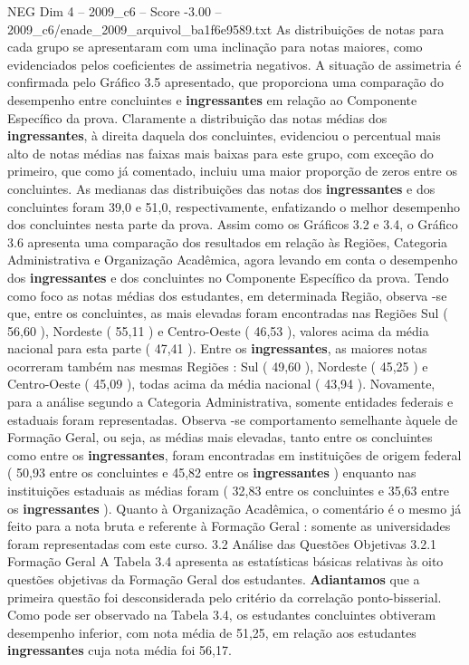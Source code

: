 \begin{textsample}{NEG Dim 4 – 2009\_c6 – Score -3.00 – 2009\_c6/enade\_2009\_arquivol\_ba1f6e9589.txt}
As distribuições de notas para cada grupo se apresentaram com uma inclinação para notas maiores, como evidenciados pelos coeficientes de assimetria negativos.
A situação de assimetria é confirmada pelo Gráfico 3.5 apresentado, que proporciona uma comparação do desempenho entre concluintes e \textbf{ingressantes} em relação ao Componente Específico da prova.
Claramente a distribuição das notas médias dos \textbf{ingressantes}, à direita daquela dos concluintes, evidenciou o percentual mais alto de notas médias nas faixas mais baixas para este grupo, com exceção do primeiro, que como já comentado, incluiu uma maior proporção de zeros entre os concluintes.
As medianas das distribuições das notas dos \textbf{ingressantes} e dos concluintes foram 39,0 e 51,0, respectivamente, enfatizando o melhor desempenho dos concluintes nesta parte da prova.
Assim como os Gráficos 3.2 e 3.4, o Gráfico 3.6 apresenta uma comparação dos resultados em relação às Regiões, Categoria Administrativa e Organização Acadêmica, agora levando em conta o desempenho dos \textbf{ingressantes} e dos concluintes no Componente Específico da prova.
Tendo como foco as notas médias dos estudantes, em determinada Região, observa -se que, entre os concluintes, as mais elevadas foram encontradas nas Regiões Sul ( 56,60 ), Nordeste ( 55,11 ) e Centro-Oeste ( 46,53 ), valores acima da média nacional para esta parte ( 47,41 ).
Entre os \textbf{ingressantes}, as maiores notas ocorreram também nas mesmas Regiões : Sul ( 49,60 ), Nordeste ( 45,25 ) e Centro-Oeste ( 45,09 ), todas acima da média nacional ( 43,94 ).
Novamente, para a análise segundo a Categoria Administrativa, somente entidades federais e estaduais foram representadas.
Observa -se comportamento semelhante àquele de Formação Geral, ou seja, as médias mais elevadas, tanto entre os concluintes como entre os \textbf{ingressantes}, foram encontradas em instituições de origem federal ( 50,93 entre os concluintes e 45,82 entre os \textbf{ingressantes} ) enquanto nas instituições estaduais as médias foram ( 32,83 entre os concluintes e 35,63 entre os \textbf{ingressantes} ).
Quanto à Organização Acadêmica, o comentário é o mesmo já feito para a nota bruta e referente à Formação Geral : somente as universidades foram representadas com este curso. 3.2 Análise das Questões Objetivas 3.2.1 Formação Geral A Tabela 3.4 apresenta as estatísticas básicas relativas às oito questões objetivas da Formação Geral dos estudantes. \textbf{Adiantamos} que a primeira questão foi desconsiderada pelo critério da correlação ponto-bisserial.
Como pode ser observado na Tabela 3.4, os estudantes concluintes obtiveram desempenho inferior, com nota média de 51,25, em relação aos estudantes \textbf{ingressantes} cuja nota média foi 56,17.

\end{textsample}
